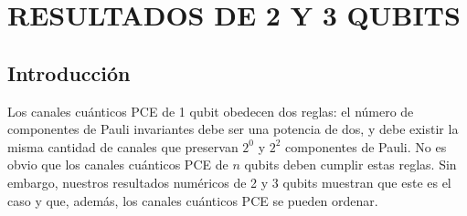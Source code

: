\chapter{RESULTADOS DE 2 Y 3 QUBITS}
\section{Introducción} %
Los canales cuánticos PCE de 1 qubit obedecen dos reglas:
el número de componentes de Pauli invariantes 
debe ser una potencia de dos, y debe existir la misma cantidad de canales que preservan 
$2^0$ y $2^2$ componentes de Pauli. No es obvio que los canales cuánticos PCE
de $n$ qubits deben cumplir estas reglas. Sin embargo, 
nuestros resultados numéricos de 2 y 3 qubits muestran que este
es el caso y que, además, los canales cuánticos PCE se pueden ordenar.

